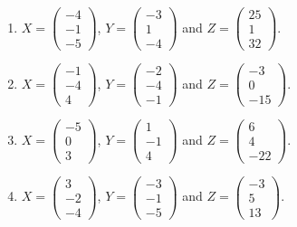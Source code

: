 \begin{enumerate}[label=\arabic*.,  leftmargin=*]
\item $X = \begin{pmatrix} -4 \\ -1 \\ -5 \end{pmatrix}$, $Y = \begin{pmatrix} -3 \\ 1 \\ -4 \end{pmatrix}$ and $Z = \begin{pmatrix} 25 \\ 1 \\ 32 \end{pmatrix}$.
\item $X = \begin{pmatrix} -1 \\ -4 \\ 4 \end{pmatrix}$, $Y = \begin{pmatrix} -2 \\ -4 \\ -1 \end{pmatrix}$ and $Z = \begin{pmatrix} -3 \\ 0 \\ -15 \end{pmatrix}$.
\item $X = \begin{pmatrix} -5 \\ 0 \\ 3 \end{pmatrix}$, $Y = \begin{pmatrix} 1 \\ -1 \\ 4 \end{pmatrix}$ and $Z = \begin{pmatrix} 6 \\ 4 \\ -22 \end{pmatrix}$.
\item $X = \begin{pmatrix} 3 \\ -2 \\ -4 \end{pmatrix}$, $Y = \begin{pmatrix} -3 \\ -1 \\ -5 \end{pmatrix}$ and $Z = \begin{pmatrix} -3 \\ 5 \\ 13 \end{pmatrix}$.

\end{enumerate}
